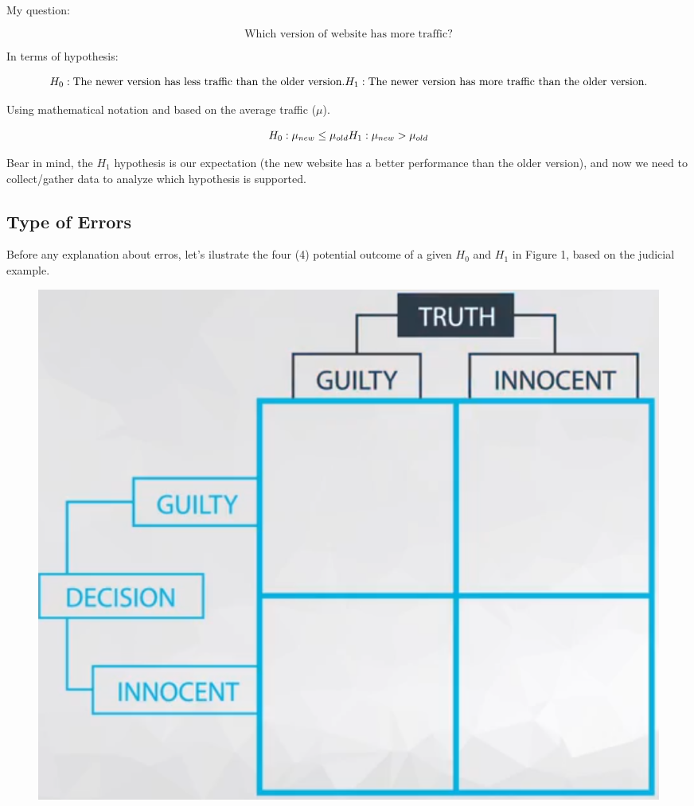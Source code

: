 \documentclass[]{book}
\begin{document}
My question:

\[ \text{Which version of website has more traffic?} \]

In terms of hypothesis:

\[H_0: \text{The newer version has less traffic than the older version.} \\
  H_1:\text{The newer version has more traffic than the older version.} \]

Using mathematical notation and based on the average traffic (\(\mu\)).

\[H_0: \mu_{new} \leq \mu_{old} \\
  H_1: \mu_{new} > \mu_{old} \]

Bear in mind, the \(H_1\) hypothesis is our expectation (the new website
has a better performance than the older version), and now we need to
collect/gather data to analyze which hypothesis is supported.

\subsection{Type of Errors}\label{type-of-errors}

Before any explanation about erros, let's ilustrate the four (4)
potential outcome of a given \(H_0\) and \(H_1\) in Figure 1, based on
the judicial example.

\begin{figure}
\centering
\includegraphics{01-img/c4_l12_01.png}
\caption{}
\end{figure}
\end{document}
